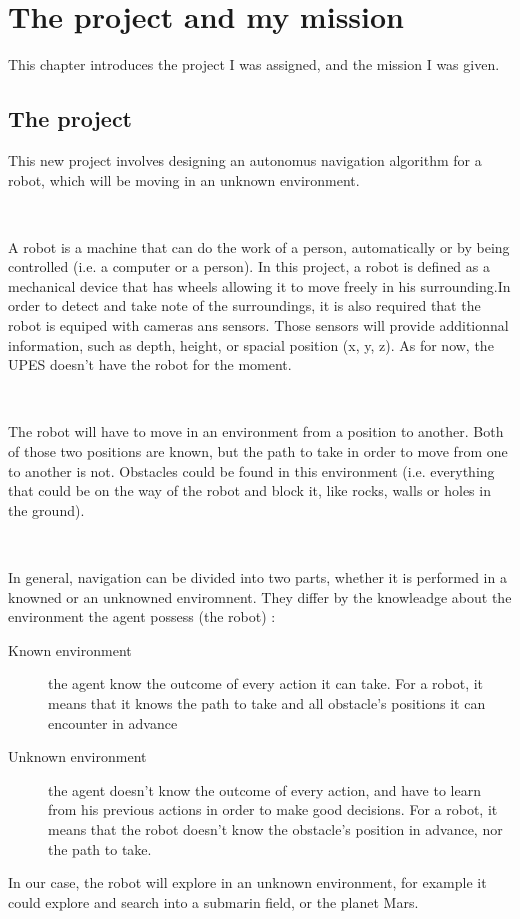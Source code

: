 \chapter{The project and my mission}

This chapter introduces the project I was assigned, and the mission I was given.

\section{The project}

This new project involves designing an autonomus navigation algorithm for a robot, which will be moving in an unknown environment. 

~~

A robot is a machine that can do the work of a person, automatically or by being controlled (i.e. a computer or a person). In this project, a robot is defined as a mechanical device that has wheels allowing it to move freely in his surrounding.In order to detect and take note of the surroundings, it is also required that the robot is equiped with cameras ans sensors. Those sensors will provide additionnal information, such as depth, height, or spacial position (x, y, z). 
As for now, the \gls{UPES} doesn't have the robot for the moment. 

~~

The robot will have to move in an environment from a position to another. Both of those two positions are known, but the path to take in order to move from one to another is not. Obstacles could be found in this environment (i.e. everything that could be on the way of the robot and block it, like rocks, walls or holes in the ground). 

~~

In general, navigation can be divided into two parts, whether it is performed in a knowned or an unknowned enviromnent. They differ by the knowleadge about the environment the agent possess (the robot) \cite{Russell:2010:AIM} : 
\begin{description}
	\item[Known environment] the agent know the outcome of every action it can take. For a robot, it means that it knows the path to take and all obstacle's positions it can encounter in advance 
	\item[Unknown environment] the agent doesn't know the outcome of every action, and have to learn from his previous actions in order to make good decisions. For a robot, it means that the robot doesn't know the obstacle's position in advance, nor the path to take.
\end{description}
In our case, the robot will explore in an unknown environment, for example it could explore and search into a submarin field, or the planet Mars. 


